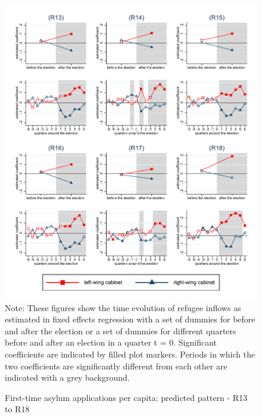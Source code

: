 \documentclass[11pt,a4paper]{scrartcl}
\begin{document}
\clearpage
\FloatBarrier


\clearpage
\FloatBarrier


\clearpage
\FloatBarrier




\clearpage
\FloatBarrier


\clearpage
\FloatBarrier
\begin{figure}[!ht]
	\caption{First-time asylum applications per capita: predicted pattern - R13 to R18}
	\includegraphics[width=1\textwidth]{../results/applications/app_graphs_R13-R18.pdf}
	\scriptsize{Note: These figures show the time evolution of refugee inflows as estimated in fixed effects regression
		with a set of dummies for before and after the election or a set of dummies for different quarters before and after an election in a quarter t = 0. Significant coefficients are indicated by filled plot markers. Periods in which the two coefficients are significantly different from each other are indicated with a grey background.}
\end{figure}
\end{document}
